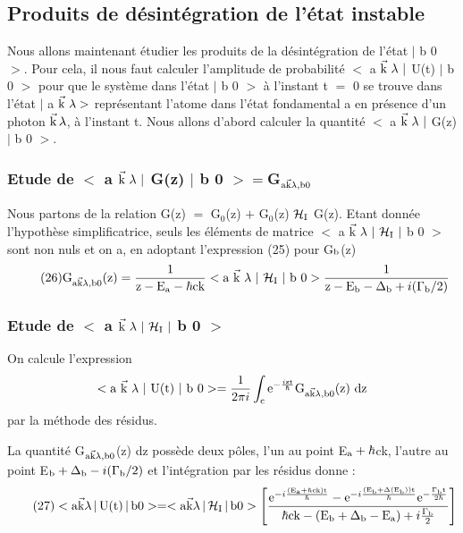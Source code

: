 \subsection{Produits de désintégration de l'état instable}%
Nous allons maintenant étudier les produits de la désintégration de
l'état $|$ b 0 $>$. Pour cela, il nous faut calculer l'amplitude de probabilité
$<$ a $\vec{\text{k}}\ \lambda\ |$ U(t) $|$ b 0 $>$ pour que le système dans l'état $|$ b 0 $>$ à l'instant t $=$
0 se trouve dans l'état $|$ a $\vec{\text{k}}\ \lambda>$ représentant l'atome dans l'état fondamental a
en présence d'un photon $\vec{\text{k}}\,\lambda$, à l'instant t. Nous allons d'abord calculer la quantité
$<$ a $\vec{\text{k}}\ \lambda\ |$ G(z) $|$ b 0 $>$.

\subsubsection{Etude de $<$ a $\vec{\text{k}}\ \lambda\ |$ G(z) $|$ b 0 $>=$G$_{\text{a}\vec{\text{k}}\lambda,\text{b}0}$}%
Nous partons de la relation G(z) $=$ G$_0$(z) $+$ G$_0$(z) $\mathcal{H}_{\text{I}}$ G(z).
Etant donnée l'hypothèse simplificatrice, seuls les éléments de matrice
$<$ a $\vec{\mt{k}}\ \lambda\ |\ \mc{H}_\mt{I}\ |$ b 0 $>$ sont non nuls et on a, en adoptant l'expression (25)
pour G$_{\text{b}}$(z)
\[
\tag{26}\text{G}_{\text{a}\vec{\text{k}}\lambda,\text{b}0}\text{(z)}=
\frac{1}{\text{z}-\text{E}_{\text{a}}-\hbar\text{c}\text{k}}
<\text{a }\vec{\text{k}}\ \lambda\ |\ \mathcal{H}_{\text{I}}\ |\text{ b } 0 >
\frac{1}{\text{z}-\text{E}_{\text{b}}-\Delta_{\text{b}}+i(\Gamma_{\text{b}}/2)}
\]



\subsubsection{Etude de $<$ a $\vec{\mt{k}}\ \lambda\ |\ \mc{H}_\mt{I}\ |$ b 0 $>$}%
On calcule l'expression
\[
<\text{a }\vec{\text{k}}\ \lambda\ |\ \text{U(t)}\ |\text{ b } 0 >=\frac{1}{2\pi i}\int_{\text{c}}
\text{e}^{-\frac{i\text{zt}}{\hbar}}\text{G}_{\text{a}\vec{\text{k}}\lambda,\text{b}0}\text{(z) dz}
\]
par la méthode des résidus.

La quantité G$_{\text{a}\vec{\text{k}}\lambda,\text{b}0}$(z) dz possède deux pôles, l'un au point E$_{\text{a}}+\hbar$ck,
l'autre au point E$_{\text{b}}+\Delta_{\text{b}}-i(\Gamma_{\text{b}}/2)$ et l'intégration par les résidus
donne :
\[
\tag{27}<\text{a}\vec{\text{k}}\lambda\,|\,\text{U(t)}\,|\,\text{b}0 >=
<\text{a}\vec{\text{k}}\lambda\,|\,\mathcal{H}_{\text{I}}\,|\,\text{b}0 >
\left[\frac{\text{e}^{-i\frac{(\text{E}_{\text{a}}+\hbar\text{ck)t}}{\hbar}}
-\text{e}^{-i\frac{(\text{E}_{\text{b}}+\Delta(\text{E}_{\text{b}})\text{)t}}{\hbar}}
\text{e}^{-\frac{\Gamma_{\text{b}}\text{t}}{2\hbar}}}
{\hbar\text{ck}-(\text{E}_{\text{b}}+\Delta_{\text{b}}-\text{E}_{\text{a}})+i\frac{\Gamma_{\text{b}}}{2}}\right]
\]

